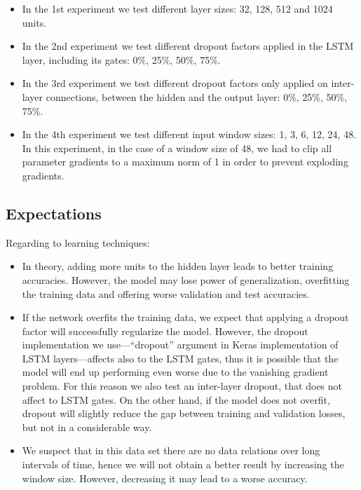 \documentclass[]{article}
\begin{document}
	\begin{itemize}
		\item In the 1st experiment we test different layer sizes: 32, 128, 512 and 1024 units.
		
		\item In the 2nd experiment we test different dropout factors applied in the LSTM layer, including its gates: 0\%, 25\%, 50\%, 75\%.
		
		\item In the 3rd experiment we test different dropout factors only applied on inter-layer connections, between the hidden and the output layer: 0\%, 25\%, 50\%, 75\%.
		
		\item In the 4th experiment we test different input window sizes: 1, 3, 6, 12, 24, 48. In this experiment, in the case of a window size of 48, we had to clip all parameter gradients to a maximum norm of 1 in order to prevent exploding gradients.
	\end{itemize}
	
	\subsection{Expectations}
	
	Regarding to learning techniques:
	
	\begin{itemize}
		\item In theory, adding more units to the hidden layer leads to better training accuracies. However, the model may lose power of generalization, overfitting the training data and offering worse validation and test accuracies.
		
		\item If the network overfits the training data, we expect that applying a dropout factor will successfully regularize the model. However, the dropout implementation we use---``dropout'' argument in Keras implementation of LSTM layers---affects also to the LSTM gates, thus it is possible that the model will end up performing even worse due to the vanishing gradient problem. For this reason we also test an inter-layer dropout, that does not affect to LSTM gates. On the other hand, if the model does not overfit, dropout will slightly reduce the gap between training and validation losses, but not in a considerable way.
		
		\item We suspect that in this data set there are no data relations over long intervals of time, hence we will not obtain a better result by increasing the window size. However, decreasing it may lead to a worse accuracy.
	\end{itemize}
	
\end{document}
